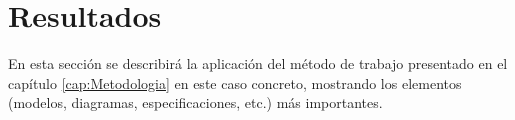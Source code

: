 \chapter{Resultados}
\label{cap:Resultados}

En esta sección se describirá la aplicación del método de trabajo presentado en el capítulo \ref{cap:Metodologia} en este caso concreto, mostrando los elementos (modelos, diagramas, especificaciones, etc.) más importantes.